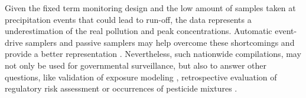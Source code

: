 \documentclass[journal=esthag,manuscript=article]{achemso}
\begin{document}
Given the fixed term monitoring design \citep{stehle_probabilistic_2013} and the low amount of samples taken at precipitation events that could lead to run-off, the data represents a underestimation of the real pollution and peak concentrations.
%
%
%
%
Automatic event-drive samplers and passive samplers may help overcome these shortcomings and provide a better representation \citep{fernandez_calibration_2014,moschet_evaluation_2015}.
Nevertheless, such nationwide compilations, may not only be used for governmental surveillance, but also to answer other questions, like validation of exposure modeling \cite{knabel_fungicide_2014}, retrospective evaluation of regulatory risk assessment \citep{knauer_pesticides_2016,stehle_pesticide_2015}or occurrences of pesticide mixtures \cite{schreiner_pesticide_2016}.
\end{document}
